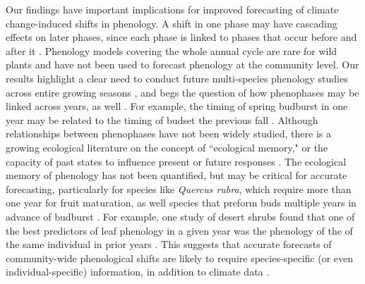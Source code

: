 \documentclass{article}
\begin{document}
\par Our findings have important implications for improved forecasting of climate change-induced shifts in phenology. A shift in one phase may have cascading effects on later phases, since each phase is linked to phases that occur before and after it \citep{wolkovich2014b}. Phenology models covering the whole annual cycle are rare for wild plants \citep[but see][]{chuine2001, li2016} and have not been used to forecast phenology at the community level. Our results highlight a clear need to conduct future multi-species phenology studies across entire growing seasons \citep{wolkovich2014}, and begs the question of how phenophases may be linked across years, as well \citep[e.g.,][]{elmendorf2016}. For example, the timing of spring budburst in one year may be related to the timing of budset the previous fall \citep {mimura2010}. Although relationships between phenophases have not been widely studied, there is a growing ecological literature on the concept of ``ecological memory," or the capacity of past states to influence present or future responses \citep {ogle2015}. The ecological memory of phenology has not been quantified, but may be critical for accurate forecasting, particularly for species like \emph{Quercus rubra}, which require more than one year for fruit maturation, as well species that preform buds multiple years in advance of budburst \citep{diggle1997,klimes2007}. For example, one study of desert shrubs found that one of the best predictors of leaf phenology in a given year was the phenology of the of the same individual in prior years \citep{cody2003}. This suggests that accurate forecasts of community-wide phenological shifts are likely to require species-specific (or even individual-specific) information, in addition to climate data \citep{diez2012}.
\end{document}
